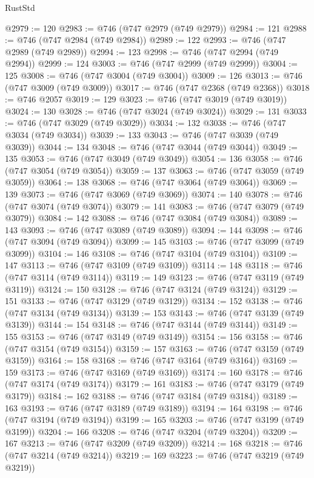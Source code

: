 \begin{lexlean}{RustStd}
\begin{coremodule}
@2979 := 120
@2983 := @746 (@747 @2979 (@749 @2979))
@2984 := 121
@2988 := @746 (@747 @2984 (@749 @2984))
@2989 := 122
@2993 := @746 (@747 @2989 (@749 @2989))
@2994 := 123
@2998 := @746 (@747 @2994 (@749 @2994))
@2999 := 124
@3003 := @746 (@747 @2999 (@749 @2999))
@3004 := 125
@3008 := @746 (@747 @3004 (@749 @3004))
@3009 := 126
@3013 := @746 (@747 @3009 (@749 @3009))
@3017 := @746 (@747 @2368 (@749 @2368))
@3018 := @746 @2057
@3019 := 129
@3023 := @746 (@747 @3019 (@749 @3019))
@3024 := 130
@3028 := @746 (@747 @3024 (@749 @3024))
@3029 := 131
@3033 := @746 (@747 @3029 (@749 @3029))
@3034 := 132
@3038 := @746 (@747 @3034 (@749 @3034))
@3039 := 133
@3043 := @746 (@747 @3039 (@749 @3039))
@3044 := 134
@3048 := @746 (@747 @3044 (@749 @3044))
@3049 := 135
@3053 := @746 (@747 @3049 (@749 @3049))
@3054 := 136
@3058 := @746 (@747 @3054 (@749 @3054))
@3059 := 137
@3063 := @746 (@747 @3059 (@749 @3059))
@3064 := 138
@3068 := @746 (@747 @3064 (@749 @3064))
@3069 := 139
@3073 := @746 (@747 @3069 (@749 @3069))
@3074 := 140
@3078 := @746 (@747 @3074 (@749 @3074))
@3079 := 141
@3083 := @746 (@747 @3079 (@749 @3079))
@3084 := 142
@3088 := @746 (@747 @3084 (@749 @3084))
@3089 := 143
@3093 := @746 (@747 @3089 (@749 @3089))
@3094 := 144
@3098 := @746 (@747 @3094 (@749 @3094))
@3099 := 145
@3103 := @746 (@747 @3099 (@749 @3099))
@3104 := 146
@3108 := @746 (@747 @3104 (@749 @3104))
@3109 := 147
@3113 := @746 (@747 @3109 (@749 @3109))
@3114 := 148
@3118 := @746 (@747 @3114 (@749 @3114))
@3119 := 149
@3123 := @746 (@747 @3119 (@749 @3119))
@3124 := 150
@3128 := @746 (@747 @3124 (@749 @3124))
@3129 := 151
@3133 := @746 (@747 @3129 (@749 @3129))
@3134 := 152
@3138 := @746 (@747 @3134 (@749 @3134))
@3139 := 153
@3143 := @746 (@747 @3139 (@749 @3139))
@3144 := 154
@3148 := @746 (@747 @3144 (@749 @3144))
@3149 := 155
@3153 := @746 (@747 @3149 (@749 @3149))
@3154 := 156
@3158 := @746 (@747 @3154 (@749 @3154))
@3159 := 157
@3163 := @746 (@747 @3159 (@749 @3159))
@3164 := 158
@3168 := @746 (@747 @3164 (@749 @3164))
@3169 := 159
@3173 := @746 (@747 @3169 (@749 @3169))
@3174 := 160
@3178 := @746 (@747 @3174 (@749 @3174))
@3179 := 161
@3183 := @746 (@747 @3179 (@749 @3179))
@3184 := 162
@3188 := @746 (@747 @3184 (@749 @3184))
@3189 := 163
@3193 := @746 (@747 @3189 (@749 @3189))
@3194 := 164
@3198 := @746 (@747 @3194 (@749 @3194))
@3199 := 165
@3203 := @746 (@747 @3199 (@749 @3199))
@3204 := 166
@3208 := @746 (@747 @3204 (@749 @3204))
@3209 := 167
@3213 := @746 (@747 @3209 (@749 @3209))
@3214 := 168
@3218 := @746 (@747 @3214 (@749 @3214))
@3219 := 169
@3223 := @746 (@747 @3219 (@749 @3219))

\end{coremodule}
\end{lexlean}
